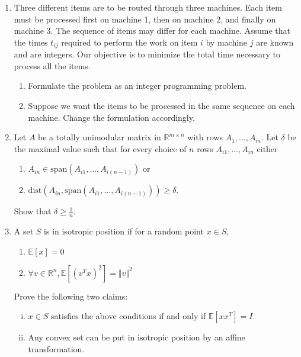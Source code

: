 \documentclass[11pt,a4paper]{article}
\renewcommand{\geq}{\geqslant}
\begin{document}
\begin{enumerate}
\item Three different items are to be routed through three machines. Each item must be processed first on machine 1, then
on machine 2, and finally on machine 3. The sequence of items may differ for each machine. Assume that the times
$t_{ij}$ required to perform the work on item $i$ by machine $j$ are known and are integers. Our objective is to minimize the total time necessary to process all the items.
\begin{enumerate}
    \item Formulate the problem as an integer programming problem.
    \item Suppose we want the items to be processed in the same sequence on each machine. Change the formulation accordingly.
\end{enumerate}

\item Let $A$ be a totally unimodular matrix in $\mathbb{R}^{m \times n}$ with rows $A_1, \hdots, A_m$. Let $\delta$ be the maximal value such that for every choice of $n$ rows $A_{i1}, \hdots, A_{in}$ either 
\begin{enumerate}
    \item $A_{in} \in \text{span}(A_{i1}, \hdots, A_{i(n-1)})$ or 
    \item $\text{dist}(A_{in}, \text{span}(A_{i1}, \hdots, A_{i(n-1)})) \geq \delta$. 
\end{enumerate}
Show that $\delta \geq \frac{1}{n}$. 

\item A set $S$ is in isotropic position if for a random point $x ∈ S$, \begin{enumerate}
    \item $\mathbb{E}[x] = 0 $
    \item $\forall v \in \mathbb{R}^n, \mathbb{E}[(v^Tx)^2] = \Vert v \Vert^2$
\end{enumerate}
Prove the following two claims:
\begin{enumerate}[(i)]
    \item $x \in S$ satisfies the above conditions if and only if $\mathbb{E}[xx^T ] = I$.
    \item Any convex set can be put in isotropic position by an affine transformation.
\end{enumerate}



\end{enumerate}


%
%


 
\end{document}
